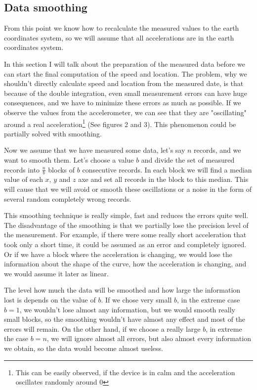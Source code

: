 \documentclass[hidelinks,a4paper]{article}
\begin{document}
\subsection{Data smoothing}
From this point we know how to recalculate the measured values to the earth coordinates system, so we will assume that all accelerations are in the earth coordinates system.\par
In this section I will talk about the preparation of the measured data before we can start the final computation of the speed and location. The problem, why we shouldn't directly calculate speed and location from the measured date, is that because of the double integration, even small measurement errors can have huge consequences, and we have to minimize these errors as much as possible. If we observe the values from the accelerometer, we can see that they are "oscillating" around a real acceleration\footnote{This can be easily observed, if the device is in calm and the acceleration oscillates randomly around 0} (See figures 2 and 3). This phenomenon could be partially solved with smoothing.\par
Now we assume that we have measured some data, let's say $n$ records, and we want to smooth them. Let's choose a value $b$ and divide the set of measured records into $\tfrac{n}{b}$ blocks of $b$ consecutive records. In each block we will find a median value of each $x$, $y$ and $z$ axe and set all records in the block to this median. This will cause that we will avoid or smooth these oscillations or a noise in the form of several random completely wrong records.\par
This smoothing technique is really simple, fast and reduces the errors quite well. The disadvantage of the smoothing is that we partially lose the precision level of the measurement. For example, if there were some really short acceleration that took only a short time, it could be assumed as an error and completely ignored. Or if we have a block where the acceleration is changing, we would lose the information about the shape of the curve, how the acceleration is changing, and we would assume it later as linear.\par
The level how much the data will be smoothed and how large the information lost is depends on the value of $b$. If we chose very small $b$, in the extreme case $b = 1$, we wouldn't lose almost any information, but we would smooth really small blocks, so the smoothing wouldn't have almost any effect and most of the errors will remain. On the other hand, if we choose a really large $b$, in extreme the case $b = n$, we will ignore almost all errors, but also almost every information we obtain, so the data would become almost useless.\par
\end{document}
